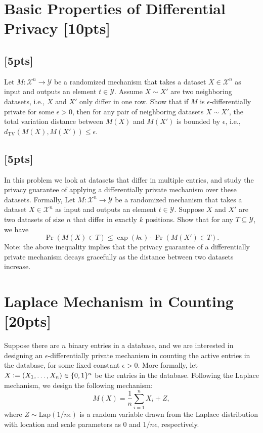\documentclass[letterpaper,11pt]{article}
\theoremstyle{definition}
\newcommand{\defeq}{\vcentcolon=}
\newcommand{\dtv}{d_{\text{TV}}}
\begin{document}
\section{Basic Properties of Differential Privacy [10pts]}
\subsection{[5pts]}
Let $M:\mathcal{X}^n\to\mathcal{Y}$ be a randomized mechanism that takes a dataset $X\in\mathcal{X}^n$ as input and outputs an element $t\in\mathcal{Y}$. Assume $X\sim X'$ are two neighboring datasets, i.e., $X$ and $X'$ only differ in one row. Show that if $M$ is $\epsilon$-differentially private for some $\epsilon > 0$, then for any pair of neighboring datasets $X\sim X'$, the total variation distance between $M(X)$ and $M(X')$ is bounded by $\epsilon$, i.e., $\dtv(M(X), M(X'))\leq\epsilon$.

\subsection{[5pts]}
In this problem we look at datasets that differ in multiple entries, and study the privacy guarantee of applying a differentially private mechanism over these datasets. Formally, Let $M:\mathcal{X}^n\to\mathcal{Y}$ be a randomized mechanism that takes a dataset $X\in\mathcal{X}^n$ as input and outputs an element $t\in\mathcal{Y}$. Suppose $X$ and $X'$ are two datasets of size $n$ that differ in exactly $k$ positions. Show that for any $T\subseteq\mathcal{Y}$, we have
\begin{equation*}
    \Pr(M(X)\in T) \leq\exp(k\epsilon)\cdot \Pr(M(X')\in T).
\end{equation*}
Note: the above inequality implies that the privacy guarantee of a differentially private mechanism decays gracefully as the distance between two datasets increase.

\section{Laplace Mechanism in Counting [20pts]}
Suppose there are $n$ binary entries in a database, and we are interested in designing an $\epsilon$-differentially private mechanism in counting the active entries in the database, for some fixed constant $\epsilon > 0$. More formally, let $X \defeq (X_1,\ldots, X_n)\in\{0,1\}^n$ be the entries in the database. Following the Laplace mechanism, we design the following mechanism:
\begin{equation*}
    M(X) = \frac{1}{n}\sum_{i=1}^n X_i + Z,
\end{equation*}
where $Z\sim \text{Lap}(1/n\epsilon)$ is a random variable drawn from the Laplace distribution with location and scale parameters as 0 and $1/n\epsilon$, respectively.
\end{document}
